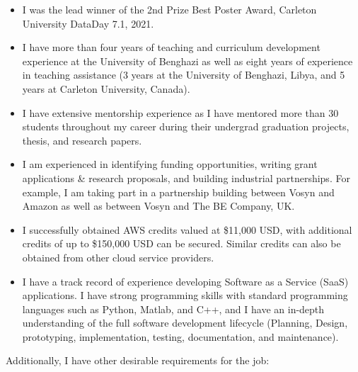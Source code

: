 \documentclass[letterpaper,11pt,oneside]{article}
\begin{document}
\begin{itemize}
    \item I was the lead winner of the 2nd Prize Best Poster Award, Carleton University DataDay 7.1, 2021. 
    \item I have more than four years of teaching and curriculum development experience at the University of Benghazi as well as eight years of experience in teaching assistance (3 years at the University of Benghazi, Libya, and 5 years at Carleton University, Canada). %
    \item I have extensive mentorship experience as I have mentored more than 30 students throughout my career during their undergrad graduation projects, thesis, and research papers. %
    \item I am experienced in identifying funding opportunities, writing grant applications \& research proposals, and building industrial partnerships. For example, I am taking part in a partnership building between Vosyn and Amazon as well as between Vosyn and The BE Company, UK.

   \item I successfully obtained AWS credits valued at \$11,000 USD, with additional credits of up to \$150,000 USD can be secured. Similar credits can also be obtained from other cloud service providers.
   

\item %
    I have a track record of experience developing Software as a Service (SaaS) applications. I have strong programming skills with standard programming languages such as Python, Matlab, and C++, and  I have an in-depth understanding of the full software development lifecycle (Planning, Design, prototyping, implementation, testing, documentation, and maintenance).

    
\end{itemize}

\vspace{1em}

Additionally, I have other desirable requirements for the job:
\end{document}
